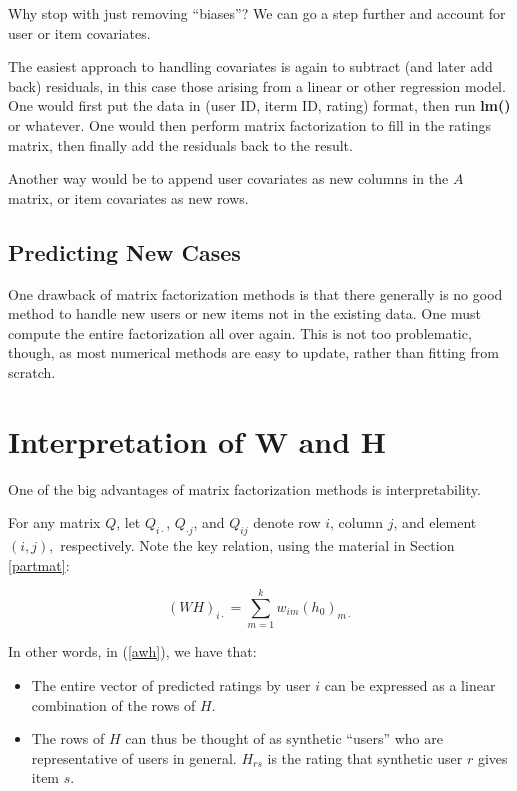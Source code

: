 Why stop with just removing ``biases''?  We can go a step further and
account for user or item covariates.

The easiest approach to handling covariates is again to subtract (and
later add back) residuals, in this case those arising from a linear or
other regression model.  One would first put the data in (user ID, iterm
ID, rating) format, then run \textbf{lm()} or whatever.  One would then
perform matrix factorization to fill in the ratings matrix, then finally
add the residuals back to the result.

Another way would be to append user covariates as new columns in the $A$
matrix, or item covariates as new rows.

\subsection{Predicting New Cases} 

One drawback of matrix factorization methods is that there generally is
no good method to handle new users or new items not in the existing
data.  One must compute the entire factorization all over again.  This
is not too problematic, though, as most numerical methods are easy to
update, rather than fitting from scratch.

\section{Interpretation of W and H}

One of the big advantages of matrix factorization methods is
interpretability.

For any matrix $Q$, let $Q_{i \cdot }$, $Q_{\cdot j}$, and $Q_{ij}$
denote row $i$, column $j$, and element $(i,j),$ respectively.  Note the
key relation, using the material in Section \ref{partmat}:

\begin{equation}
(WH)_{i \cdot} = \sum_{m=1}^k w_{im} (h_0)_{m \cdot}
\end{equation}

In other words, in (\ref{awh}), we have that:

\begin{itemize}

\item The entire vector of predicted ratings by user $i$ can be
expressed as a linear combination of the rows of $H$.


\item The rows of $H$ can thus be thought of as synthetic
``users'' who are representative of users in general.  $H_{rs}$ is the
rating that synthetic user $r$ gives item $s$.

\end{itemize} 

